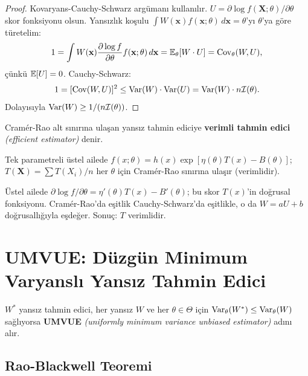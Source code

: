 \begin{proof}
Kovaryans-Cauchy-Schwarz argümanı kullanılır. $U = \partial\log f(\mathbf{X};\theta)/\partial\theta$ skor fonksiyonu olsun. Yansızlık koşulu $\int W(\mathbf{x})f(\mathbf{x};\theta)\,d\mathbf{x}=\theta$'yı $\theta$'ya göre türetelim:
\[
  1 = \int W(\mathbf{x})\frac{\partial\log f}{\partial\theta}f(\mathbf{x};\theta)\,d\mathbf{x}
  = \mathbb{E}_\theta[W\cdot U] = \operatorname{Cov}_\theta(W,U),
\]
çünkü $\mathbb{E}[U]=0$. Cauchy-Schwarz:
\[
  1 = [\operatorname{Cov}(W,U)]^2 \leq \operatorname{Var}(W)\cdot\operatorname{Var}(U) = \operatorname{Var}(W)\cdot n\mathcal{I}(\theta).
\]
Dolayısıyla $\operatorname{Var}(W)\geq 1/(n\mathcal{I}(\theta))$.
\end{proof}

\begin{tanim}[Verimlilik]\label{def:verimlilik}
Cramér-Rao alt sınırına ulaşan yansız tahmin ediciye \textbf{verimli tahmin edici} \emph{(efficient estimator)} denir.
\end{tanim}

\begin{teorem}\label{thm:ustel_verimli}
Tek parametreli üstel ailede $f(x;\theta)=h(x)\exp[\eta(\theta)T(x)-B(\theta)]$; $T(\mathbf{X}) = \sum T(X_i)/n$ her $\theta$ için Cramér-Rao sınırına ulaşır (verimlidir).
\end{teorem}

\begin{ispatiskele}
Üstel ailede $\partial\log f/\partial\theta = \eta'(\theta)T(x) - B'(\theta)$; bu skor $T(x)$'in doğrusal fonksiyonu. Cramér-Rao'da eşitlik Cauchy-Schwarz'da eşitlikle, o da $W = aU+b$ doğrusallığıyla eşdeğer. Sonuç: $T$ verimlidir.
\end{ispatiskele}

\section{UMVUE: Düzgün Minimum Varyanslı Yansız Tahmin Edici}
\label{sec:umvue}

\begin{tanim}[UMVUE]\label{def:umvue}
$W^*$ yansız tahmin edici, her yansız $W$ ve her $\theta\in\Theta$ için $\operatorname{Var}_\theta(W^*)\leq\operatorname{Var}_\theta(W)$ sağlıyorsa \textbf{UMVUE} \emph{(uniformly minimum variance unbiased estimator)} adını alır.
\end{tanim}

\subsection{Rao-Blackwell Teoremi}

